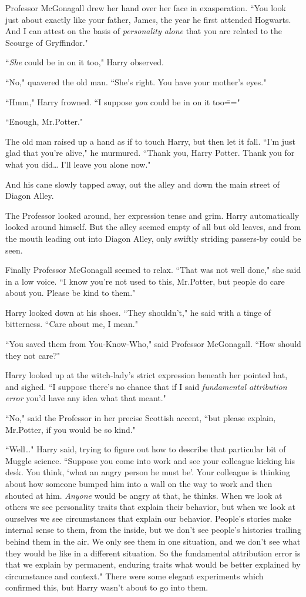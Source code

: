 Professor McGonagall drew her hand over her face in exasperation. ``You look just about exactly like your father, James, the year he first attended Hogwarts. And I can attest on the basis of \emph{personality alone} that you are related to the Scourge of Gryffindor."

``\emph{She} could be in on it too," Harry observed.

``No," quavered the old man. ``She's right. You have your mother's eyes."

``Hmm," Harry frowned. ``I suppose \emph{you} could be in on it too\==="

``Enough, Mr.\?Potter."

The old man raised up a hand as if to touch Harry, but then let it fall. ``I'm just glad that you're alive," he murmured. ``Thank you, Harry Potter. Thank you for what you did{\ldots} I'll leave you alone now."

And his cane slowly tapped away, out the alley and down the main street of Diagon Alley.

The Professor looked around, her expression tense and grim. Harry automatically looked around himself. But the alley seemed empty of all but old leaves, and from the mouth leading out into Diagon Alley, only swiftly striding passers-by could be seen.

Finally Professor McGonagall seemed to relax. ``That was not well done," she said in a low voice. ``I know you're not used to this, Mr.\?Potter, but people do care about you. Please be kind to them."

Harry looked down at his shoes. ``They shouldn't," he said with a tinge of bitterness. ``Care about me, I mean."

``You saved them from You-Know-Who," said Professor McGonagall. ``How should they not care?"

Harry looked up at the witch-lady's strict expression beneath her pointed hat, and sighed. ``I suppose there's no chance that if I said \emph{fundamental attribution error} you'd have any idea what that meant."

``No," said the Professor in her precise Scottish accent, ``but please explain, Mr.\?Potter, if you would be so kind."

``Well{\ldots}" Harry said, trying to figure out how to describe that particular bit of Muggle science. ``Suppose you come into work and see your colleague kicking his desk. You think, `what an angry person he must be'. Your colleague is thinking about how someone bumped him into a wall on the way to work and then shouted at him. \emph{Anyone} would be angry at that, he thinks. When we look at others we see personality traits that explain their behavior, but when we look at ourselves we see circumstances that explain our behavior. People's stories make internal sense to them, from the inside, but we don't see people's histories trailing behind them in the air. We only see them in one situation, and we don't see what they would be like in a different situation. So the fundamental attribution error is that we explain by permanent, enduring traits what would be better explained by circumstance and context." There were some elegant experiments which confirmed this, but Harry wasn't about to go into them.

